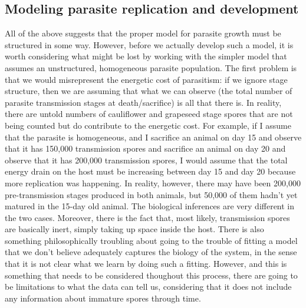 \documentclass[11pt,reqno,final,pdftex]{amsart}\usepackage[]{graphicx}\usepackage[]{color}
\theoremstyle{plain}
\numberwithin{equation}{part}
\begin{document}
\subsection*{Modeling parasite replication and development}
All of the above suggests that the proper model for parasite growth must be structured in some way.
However, before we actually develop such a model, it is worth considering what might be lost by working with the simpler model that assumes an unstructured, homogeneous parasite population.
The first problem is that we would misrepresent the energetic cost of parasitism: if we ignore stage structure, then we are assuming that what we can observe (the total number of parasite transmission stages at death/sacrifice) is all that there is.
In reality, there are untold numbers of cauliflower and grapeseed stage spores that are not being counted but do contribute to the energetic cost.
For example, if I assume that the parasite is homogeneous, and I sacrifice an animal on day 15 and observe that it has 150,000 transmission spores and sacrifice an animal on day 20 and observe that it has 200,000 transmission spores, I would assume that the total energy drain on the host must be increasing between day 15 and day 20 because more replication was happening.
In reality, however, there may have been 200,000 pre-transmission stages produced in both animals, but 50,000 of them hadn't yet matured in the 15-day old animal.
The biological inferences are very different in the two cases.
Moreover, there is the fact that, most likely, transmission spores are basically inert, simply taking up space inside the host.
There is also something philosophically troubling about going to the trouble of fitting a model that we don't believe adequately captures the biology of the system, in the sense that it is not clear what we learn by doing such a fitting.
However, and this is something that needs to be considered thoughout this process, there are going to be limitations to what the data can tell us, considering that it does not include any information about immature spores through time.
\end{document}
